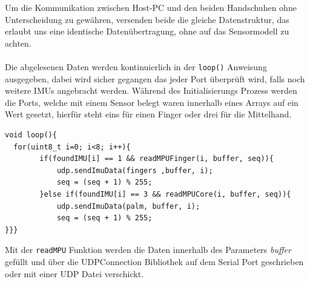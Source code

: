 Um die Kommunikation zwischen Host-PC und den beiden Handschuhen ohne Unterscheidung zu gewähren, versenden beide die gleiche Datenstruktur, das erlaubt uns eine identische Datenübertragung, ohne auf das Sensormodell zu achten. 
\\
\\
Die abgelesenen Daten werden kontinuierlich in der \lstinline{loop()} Anweisung ausgegeben, dabei wird sicher gegangen das jeder Port überprüft wird, falls noch weitere IMUs angebracht werden. Während des Initialisierungs Prozess werden die Ports, welche mit einem Sensor belegt waren innerhalb eines Arrays auf ein Wert gesetzt, hierfür steht eins für einen Finger oder drei für die Mittelhand. 
\begin{lstlisting}
void loop(){
  for(uint8_t i=0; i<8; i++){
        if(foundIMU[i] == 1 && readMPUFinger(i, buffer, seq)){
            udp.sendImuData(fingers ,buffer, i);
            seq = (seq + 1) % 255; 
        }else if(foundIMU[i] == 3 && readMPUCore(i, buffer, seq)){
            udp.sendImuData(palm, buffer, i);
            seq = (seq + 1) % 255; 
}}}
\end{lstlisting}
Mit der \lstinline{readMPU} Funktion werden die Daten innerhalb des Parameters \textit{buffer} gefüllt und über die UDPConnection Bibliothek auf dem Serial Port geschrieben oder mit einer UDP Datei verschickt.


